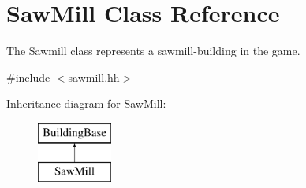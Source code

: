 \hypertarget{classSawMill}{\section{Saw\-Mill Class Reference}
\label{classSawMill}
}


The Sawmill class represents a sawmill-\/building in the game.  




{\ttfamily \#include $<$sawmill.\-hh$>$}

Inheritance diagram for Saw\-Mill\-:\begin{figure}[H]
\begin{center}
\leavevmode
\includegraphics[height=2.000000cm]{classSawMill}
\end{center}
\end{figure}

